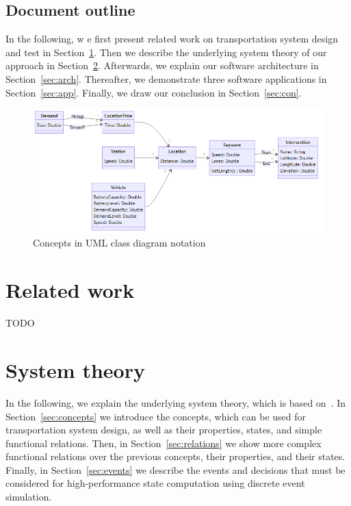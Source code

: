 \documentclass{IEEEtran}
\begin{document}
    \subsection{Document outline}
    In the following, w e first present related work on transportation system design and test in Section~\ref{sec:related}.
    Then we describe the underlying system theory of our approach in Section~\ref{sec:theory}.
    Afterwards, we explain our software architecture in Section~\ref{sec:arch}.
    Thereafter, we demonstrate three software applications in Section~\ref{sec:app}.
    Finally, we draw our conclusion in Section~\ref{sec:con}.
    
    \begin{figure}[t]
        \centering
        \includegraphics[scale=0.5]{../../diagrams/model/classes-v0.png}
        \caption{Concepts in UML class diagram notation}
        \label{fig:concepts}
    \end{figure}

    \newpage

    \section{Related work}
    \label{sec:related}
    TODO

    \newpage

    \section{System theory}
    
    \label{sec:theory}
    In the following, we explain the underlying system theory, which is based on~\cite{Ascher2014,Ascher2015,Ascher2016,Ascher2017}.
    In Section~\ref{sec:concepts} we introduce the concepts, which can be used for transportation system design, as well as their properties, states, and simple functional relations.
    Then, in Section~\ref{sec:relations} we show more complex functional relations over the previous concepts, their properties, and their states.
    Finally, in Section~\ref{sec:events} we describe the events and decisions that must be considered for high-performance state computation using discrete event simulation.
\end{document}
